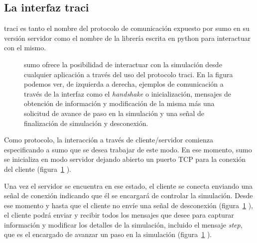 \subsection{La interfaz \gls{traci}}

\gls{traci} \cite{Wegener2008} es tanto el nombre del protocolo de comunicación expuesto por \gls{sumo} en su versión servidor como el nombre de la librería escrita en \gls{python} para interactuar con el mismo.

\begin{figure}[!b]
	\centering
	\caption[Ejemplo de forma de envío de mensajes a través de TraCI]{\gls{sumo} ofrece la posibilidad de interactuar con la simulación desde cualquier aplicación a través del uso del protocolo \gls{traci}. En la figura podemos ver, de izquierda a derecha, ejemplos de comunicación a través de la interfaz como el \textit{handshake} o inicialización, mensajes de obtención de información y modificación de la misma más una solicitud de avance de paso en la simulación y una señal de finalización de simulación y desconexión.}
	\label{fig:traci-messages}
\end{figure}

Como protocolo, la interacción a través de cliente/servidor comienza especificando a \gls{sumo} que se desea trabajar de este modo. En ese momento, \gls{sumo} se inicializa en modo servidor dejando abierto un puerto TCP para la conexión del cliente (figura~\ref{fig:traci-messages} ).

Una vez el servidor se encuentra en ese estado, el cliente se conecta enviando una señal de conexión indicando que él se encargará de controlar la simulación. Desde ese momento y hasta que el cliente no envíe una señal de desconexión (figura~\ref{fig:traci-messages} ), el cliente podrá enviar y recibir todos los mensajes que desee para capturar información y modificar los detalles de la simulación, incluido el mensaje \textit{step}, que es el encargado de avanzar un paso en la simulación (figura~\ref{fig:traci-messages} ).

